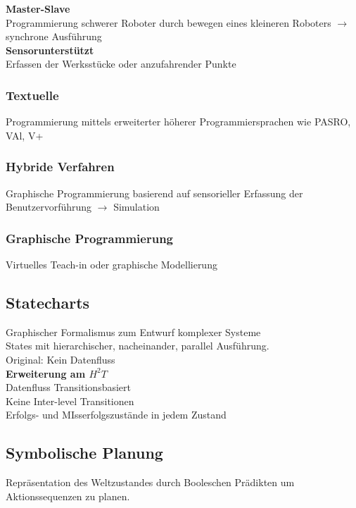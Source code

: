 \textbf{Master-Slave}\\
Programmierung schwerer Roboter durch bewegen eines kleineren Roboters \(\rightarrow\) synchrone Ausführung\\

\textbf{Sensorunterstützt}\\
Erfassen der Werksstücke oder anzufahrender Punkte


\subsubsection{Textuelle}%
\label{prog:ssub:textuelle}
Programmierung mittels erweiterter höherer Programmiersprachen wie PASRO, VAl, V+


\subsubsection{Hybride Verfahren}%
\label{prog:ssub:hybride-verfahren}
Graphische Programmierung basierend auf sensorieller Erfassung der Benutzervorführung \(\rightarrow\) Simulation


\subsubsection{Graphische Programmierung}%
\label{prog:ssub:graphische-programmierung}
Virtuelles Teach-in oder graphische Modellierung


\subsection{Statecharts}%
\label{prog:sub:statecharts}
Graphischer Formalismus zum Entwurf komplexer Systeme\\
States mit hierarchischer, nacheinander, parallel Ausführung.\\
Original: Kein Datenfluss\\

\textbf{Erweiterung am \(H^2T\)}\\
Datenfluss Transitionsbasiert\\
Keine Inter-level Transitionen\\
Erfolgs- und MIsserfolgszustände in jedem Zustand


\subsection{Symbolische Planung}%
\label{prog:sub:symbolische-planung}
Repräsentation des Weltzustandes durch Booleschen Prädikten um Aktionssequenzen zu planen.\\


